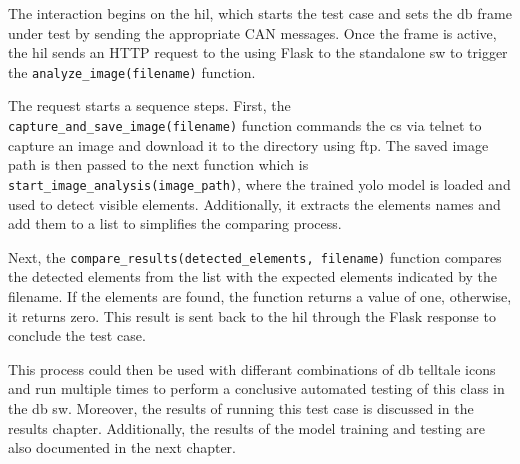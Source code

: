 The interaction begins on the \gls{hil}, which starts the test case and sets the \gls{db} frame under test by sending the appropriate CAN messages. Once the frame is active, the \gls{hil} sends an HTTP request to the using Flask to the standalone \gls{sw} to trigger the \texttt{analyze\_image(filename)} function.

The request starts a sequence steps. First, the \texttt{capture\_and\_save\_image(filename)} function commands the \gls{cs} via \gls{telnet} to capture an image and download it to the directory using \gls{ftp}. The saved image path is then passed to the next function which is \texttt{start\_image\_analysis(image\_path)}, where the trained \gls{yolo} model is loaded and used to detect visible elements. Additionally, it extracts the elements names and add them to a list to simplifies the comparing process.

Next, the \texttt{compare\_results(detected\_elements, filename)} function compares the detected elements from the list with the expected elements indicated by the filename. If the elements are found, the function returns a value of one, otherwise, it returns zero. This result is sent back to the \gls{hil} through the Flask response to conclude the test case.

This process could then be used with differant combinations of \gls{db} telltale icons and run multiple times to perform a conclusive automated testing of this class in the \gls{db} \gls{sw}. Moreover, the results of running this test case is discussed in the results chapter. Additionally, the results of the model training and testing are also documented in the next chapter. 


